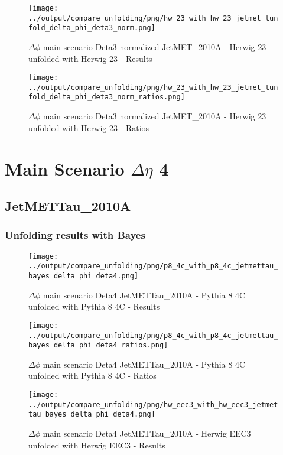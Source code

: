 \documentclass[11pt]{book}
\begin{document}
\begin{figure}[ht]
\centering
\texttt{[image: ../output/compare\_unfolding/png/hw\_23\_with\_hw\_23\_jetmet\_tunfold\_delta\_phi\_deta3\_norm.png]}
\caption{$\Delta\phi$ main scenario Deta3 normalized JetMET\_2010A - Herwig 23 unfolded with Herwig 23 - Results}
\label{hw_23_hw_23_jetmet_tunfold_delta_phi_deta3_norm_a}
\end{figure}

\begin{figure}[ht]
\centering
\texttt{[image: ../output/compare\_unfolding/png/hw\_23\_with\_hw\_23\_jetmet\_tunfold\_delta\_phi\_deta3\_norm\_ratios.png]}
\caption{$\Delta\phi$ main scenario Deta3 normalized JetMET\_2010A - Herwig 23 unfolded with Herwig 23 - Ratios}
\label{hw_23_hw_23_jetmet_tunfold_delta_phi_deta3_norm_b}
\end{figure}




\newpage
\chapter{Main Scenario $\Delta\eta$ 4 }
\section{JetMETTau\_2010A}
\subsection{Unfolding results with Bayes}

\begin{figure}[ht]
\centering
\texttt{[image: ../output/compare\_unfolding/png/p8\_4c\_with\_p8\_4c\_jetmettau\_bayes\_delta\_phi\_deta4.png]}
\caption{$\Delta\phi$ main scenario Deta4 JetMETTau\_2010A - Pythia 8 4C unfolded with Pythia 8 4C - Results}
\label{p8_p8_jetmettau_bayes_delta_phi_deta4_a}
\end{figure}

\begin{figure}[ht]
\centering
\texttt{[image: ../output/compare\_unfolding/png/p8\_4c\_with\_p8\_4c\_jetmettau\_bayes\_delta\_phi\_deta4\_ratios.png]}
\caption{$\Delta\phi$ main scenario Deta4 JetMETTau\_2010A - Pythia 8 4C unfolded with Pythia 8 4C - Ratios}
\label{p8_p8_jetmettau_bayes_delta_phi_deta4_b}
\end{figure}

\begin{figure}[ht]
\centering
\texttt{[image: ../output/compare\_unfolding/png/hw\_eec3\_with\_hw\_eec3\_jetmettau\_bayes\_delta\_phi\_deta4.png]}
\caption{$\Delta\phi$ main scenario Deta4 JetMETTau\_2010A - Herwig EEC3 unfolded with Herwig EEC3 - Results}
\label{hw_eec3_hw_eec3_jetmettau_bayes_delta_phi_deta4_a}
\end{figure}
\end{document}
